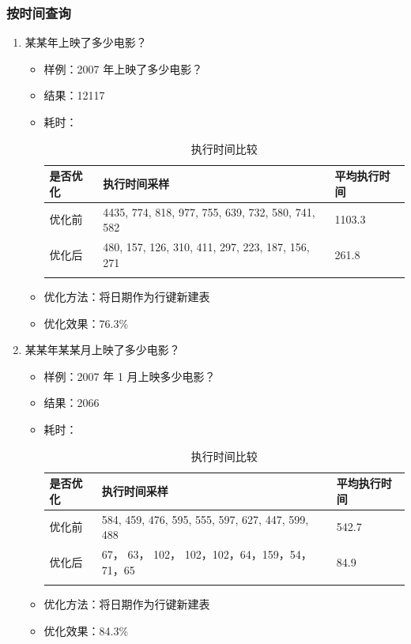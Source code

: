 \documentclass{ctexrep}
\begin{document}
	\subsubsection{按时间查询}
	    \begin{enumerate}
	        \item 某某年上映了多少电影？
    	        \begin{itemize}
    	            \item 样例：2007 年上映了多少电影？
    	            \item 结果：12117
    	            \item 耗时：
						\begin{longtable}{l|p{5cm}|l}
							\hline
							是否优化 & 执行时间采样 & 平均执行时间\\
							\hline
							\hline
							优化前 &4435, 774, 818, 977, 755, 639, 732, 580, 741, 582 & 1103.3\\
							优化后 &480, 157, 126, 310, 411, 297, 223, 187, 156, 271 & 261.8\\
							\hline
							\caption{执行时间比较}
						\end{longtable}
					\item 优化方法：将日期作为行键新建表
					\item 优化效果：76.3\%
    	        \end{itemize}
    	    \item 某某年某某月上映了多少电影？
    	        \begin{itemize}
    	            \item 样例：2007 年 1 月上映多少电影？
    	            \item 结果：2066
    	            \item 耗时：
    	                \begin{longtable}{l|p{5cm}|l}
    	                    \hline
    	                    是否优化 & 执行时间采样 & 平均执行时间\\
    	                    \hline
    	                    \hline
    	                    优化前 &584, 459, 476, 595, 555, 597, 627, 447, 599, 488 & 542.7\\
    	                    优化后 &67， 63， 102， 102，102，64，159，54，71，65 & 84.9\\
    	                    \hline
    	                    \caption{执行时间比较}
    	                \end{longtable}
    	            \item 优化方法：将日期作为行键新建表
    	            \item 优化效果：84.3\%

\end{itemize}
\end{enumerate}
\end{document}
